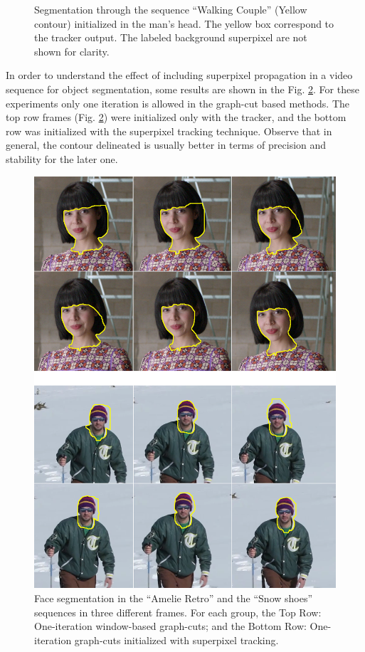 \begin{figure}[thpb]
      \caption{Segmentation through the sequence “Walking
	       Couple” (Yellow contour) initialized in the man’s head. The yellow box correspond to the tracker output.
	        The labeled background superpixel are not shown for clarity.}
      \label{figurelabel_walking}
   \end{figure}

In order to understand the effect of including superpixel propagation in a video sequence for object
segmentation, some results are shown in the Fig. \ref{figurelabel_comp}. For these experiments only one iteration is
allowed in the graph-cut based methods. The top row frames (Fig. \ref{figurelabel_comp}) were initialized only with the tracker, 
and the bottom row was initialized with the superpixel tracking technique. 
Observe that in general, the contour delineated is usually better in terms of precision and
stability for the later one.
   \begin{figure}[thpb]
      \centering
      \includegraphics[width=1.0\textwidth]{../images/Compare.png}
      \caption{Face segmentation in the “Amelie Retro” and the
	      “Snow shoes” sequences in three different frames. For each
	       group, the Top Row: One-iteration window-based graph-cuts;
	       and the Bottom Row: One-iteration graph-cuts initialized with superpixel tracking.}
      \label{figurelabel_comp}
   \end{figure}